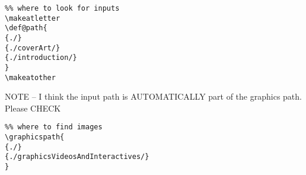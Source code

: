 \documentclass{ximera}
\begin{document}
\begin{example}
    \begin{verbatim} 
%% where to look for inputs
\makeatletter
\def@path{
{./}
{./coverArt/}
{./introduction/}
}
\makeatother   
\end{verbatim}
\end{example}

NOTE -- I think the input path is AUTOMATICALLY part of the graphics path.
Please CHECK
\begin{example}
    \begin{verbatim}
%% where to find images
\graphicspath{  
{./}
{./graphicsVideosAndInteractives/}
}    
\end{verbatim}
\end{example}
\end{document}
